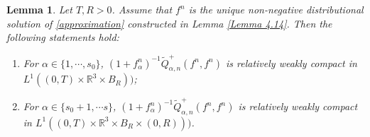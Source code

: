 \documentclass[reqno,11pt]{amsart}
\newtheorem{lemma}{Lemma}[section]
\numberwithin{equation}{section}
\def\R{\mathbb{R}}
\begin{document}
\begin{lemma} \label{theo-4.2}
		Let $T, R>0$. Assume that $f^n$ is the unique non-negative distributional solution of \eqref{approximation} constructed in Lemma \ref{Lemma 4.14}. Then the following statements hold:
		\begin{enumerate}
			\item {For $\alpha \in \{1,\cdots,s_0\}$, 
				$	(1+ f^n_\alpha)^{-1} \tilde{Q}^+ _{\alpha ,n}(f^n,f^n)$ is
				relatively weakly compact in $L^1 ((0,T)\times \R^3 \times B_R))$;}
			\item { For $\alpha \in \{s_0+1,\cdots s\}$, 
				$	(1+ f^n_\alpha)^{-1} \tilde{Q}^+ _{\alpha ,n}(f^n,f^n)$ is
				relatively weakly compact in $L^1 ((0,T)\times \R^3 \times B_R\times (0,R) ))$.}
		\end{enumerate}
	\end{lemma}
\end{document}
